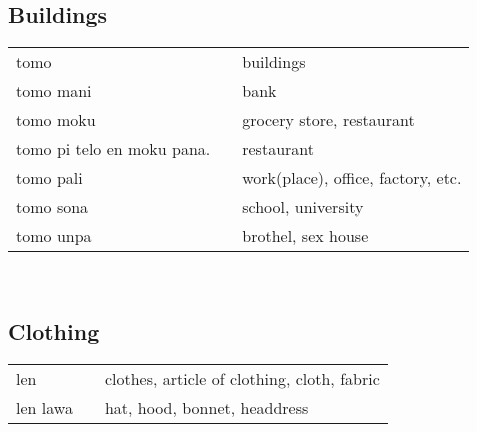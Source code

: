 %
%
\subsection{Buildings}
%
\begin{supertabular}{p{4,5cm}|ll}
    tomo                       &  & buildings                          \\
    tomo mani                  &  & bank                               \\
    tomo moku                  &  & grocery store, restaurant          \\
    tomo pi telo en moku pana. &  & restaurant                         \\
    tomo pali                  &  & work(place), office, factory, etc. \\
    tomo sona                  &  & school, university                 \\
    tomo unpa                  &  & brothel, sex house                 \\
\end{supertabular} \\
%
%
\subsection{Clothing}
%
\begin{supertabular}{p{4,5cm}|ll}
    len      &  & clothes, article of clothing, cloth, fabric \\
    len lawa &  & hat, hood, bonnet, headdress                \\
\end{supertabular} \\
%
%
